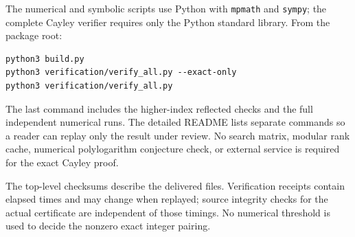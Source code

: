 \documentclass[11pt,a4paper]{article}
\numberwithin{equation}{section}
\theoremstyle{definition}
\theoremstyle{remark}
\newcommand{\src}[1]{\nolinkurl{#1}}
\begin{document}
The numerical and symbolic scripts use Python with \src{mpmath} and
\src{sympy}; the complete Cayley verifier requires only the Python
standard library. From the package root:
\begin{verbatim}
python3 build.py
python3 verification/verify_all.py --exact-only
python3 verification/verify_all.py
\end{verbatim}
The last command includes the higher-index reflected checks and the
full independent numerical runs. The detailed README lists separate
commands so a reader can replay only the result under review. No search
matrix, modular rank cache, numerical polylogarithm conjecture check,
or external service is required for the exact Cayley proof.

The top-level checksums describe the delivered files. Verification
receipts contain elapsed times and may change when replayed; source
integrity checks for the actual certificate are independent of those
timings. No numerical threshold is used to decide the nonzero exact
integer pairing.


\clearpage
\end{document}
